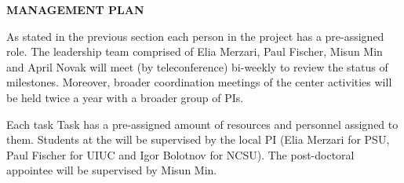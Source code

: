 \documentclass[11pt,letterpaper,english]{article}
\begin{document}
\begin{flushleft}
{\noindent \bf  {MANAGEMENT PLAN}}

As stated in the previous section each person in the project has a pre-assigned role. The leadership team comprised of Elia Merzari, Paul Fischer, Misun Min and April Novak will meet (by teleconference) bi-weekly to review the status of milestones.  Moreover, broader coordination meetings of the center activities will be held twice a year with a broader group of PIs.

Each task Task has a pre-assigned amount of resources and personnel assigned to them. Students at the  will be supervised by the local PI (Elia Merzari for PSU, Paul Fischer for UIUC and Igor Bolotnov for NCSU). The post-doctoral appointee will be supervised by Misun Min.

\end{flushleft}
\end{document}
